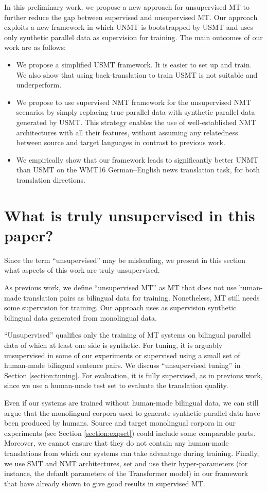 \documentclass[11pt,a4paper]{article}
\newcommand{\Sec}[1]{{Section \ref{section:#1}}}
\begin{document}
In this preliminary work, we propose a new approach for unsupervised MT to further reduce the gap between supervised and unsupervised MT. Our approach exploits a new framework in which UNMT is bootstrapped by USMT and uses only synthetic parallel data as supervision for training. The main outcomes of our work are as follows:
\begin{itemize}\itemsep=0mm
\item We propose a simplified USMT framework. It is easier to set up and train. We also show that using back-translation to train USMT is not suitable and underperform.
\item We propose to use supervised NMT framework for the unsupervised NMT scenarios by simply replacing true parallel data with synthetic parallel data generated by USMT. This strategy enables the use of well-established NMT architectures with all their features, without assuming any relatedness between source and target languages in contrast to previous work.
\item We empirically show that our framework leads to significantly better UNMT than USMT on the WMT16 German--English news translation task, for both translation directions.
\end{itemize}


\section{What is truly unsupervised in this paper?}
Since the term ``unsupervised'' may be misleading, we present in this section what aspects of this work are truly unsupervised.

As previous work, we define ``unsupervised MT'' as MT that does not use human-made translation pairs as bilingual data for training. Nonetheless, MT still needs some supervision for training. Our approach uses as supervision synthetic bilingual data generated from monolingual data. 

``Unsupervised'' qualifies only the training of MT systems on bilingual parallel data of which at least one side is synthetic. For tuning, it is arguably unsupervised in some of our experiments or supervised using a small set of human-made bilingual sentence pairs. We discuss ``unsupervised tuning'' in Section \ref{section:tuning}. For evaluation, it is fully supervised, as in previous work, since we use a human-made test set to evaluate the translation quality.

Even if our systems are trained without human-made bilingual data, we can still argue that the monolingual corpora used to generate synthetic parallel data have been produced by humans. Source and target monolingual corpora in our experiments (see \Sec{expset}) could include some comparable parts. Moreover, we cannot ensure that they do not contain any human-made translations from which our systems can take advantage during training. Finally, we use SMT and NMT architectures, set and use their hyper-parameters (for instance, the default parameters of the Transformer model) in our framework that have already shown to give good results in supervised MT.
\end{document}
